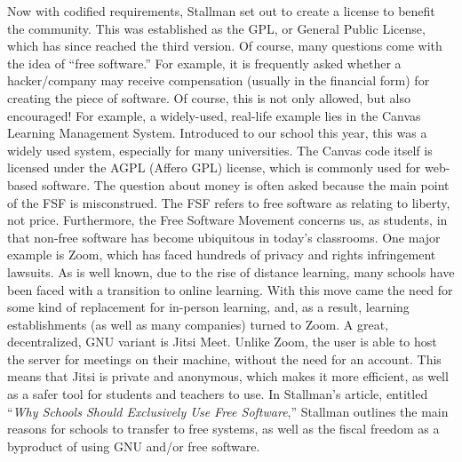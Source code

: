 \documentclass[12pt]{article}
\begin{document}
\begin{multicols}{3}
  Now with codified requirements, Stallman set out to create a license to benefit the community. This was established as the GPL, or General Public License, which has since reached the third version. Of course, many questions come with the idea of “free software.” For example, it is frequently asked whether a hacker/company may receive compensation (usually in the financial form) for creating the piece of software. Of course, this is not only allowed, but also encouraged! For example, a widely-used, real-life example lies in the Canvas Learning Management System. Introduced to our school this year, this was a widely used system, especially for many universities. The Canvas code itself is licensed under the AGPL (Affero GPL) license, which is commonly used for web-based software. The question about money is often asked because the main point of the FSF is misconstrued. The FSF refers to free software as relating to liberty, not price. Furthermore, the Free Software Movement concerns us, as students, in that non-free software has become ubiquitous in today's classrooms. One major example is Zoom, which has faced hundreds of privacy and rights infringement lawsuits. As is well known, due to the rise of distance learning, many schools have been faced with a transition to online learning. With this move came the need for some kind of replacement for in-person learning, and, as a result, learning establishments (as well as many companies) turned to Zoom. A great, decentralized, GNU variant is Jitsi Meet. Unlike Zoom, the user is able to host the server for meetings on their machine, without the need for an account. This means that Jitsi is private and anonymous, which makes it more efficient, as well as a safer tool for students and teachers to use. In Stallman's article, entitled “\textit{Why Schools Should Exclusively Use Free Software},” Stallman outlines the main reasons for schools to transfer to free systems, as well as the fiscal freedom as a byproduct of using GNU and/or free software. 

  \vfill


\end{multicols}
\end{document}
